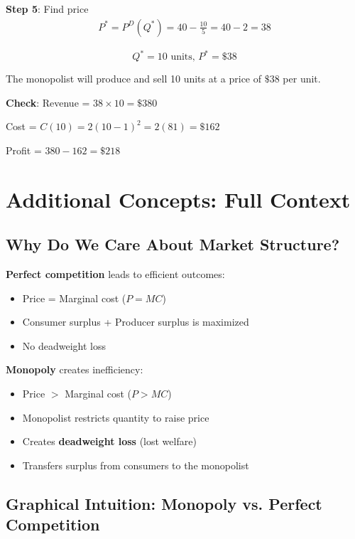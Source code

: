 \documentclass[12pt]{article}
\begin{document}
\textbf{Step 5}: Find price
\begin{align*}
P^* = P^D(Q^*) = 40 - \frac{10}{5} = 40 - 2 = 38
\end{align*}

\begin{keyidea}[Answer to 1B]
$$\boxed{Q^* = 10 \text{ units, } P^* = \$38}$$

The monopolist will produce and sell 10 units at a price of $\$38$ per unit.

\vspace{0.3cm}
\textbf{Check}: Revenue = $38 \times 10 = \$380$

Cost = $C(10) = 2(10-1)^2 = 2(81) = \$162$

Profit = $380 - 162 = \$218$
\end{keyidea}

\newpage

\section{Additional Concepts: Full Context}

\subsection{Why Do We Care About Market Structure?}

\begin{keyidea}
\textbf{Perfect competition} leads to efficient outcomes:
\begin{itemize}
\item Price = Marginal cost ($P = MC$)
\item Consumer surplus + Producer surplus is maximized
\item No deadweight loss
\end{itemize}

\textbf{Monopoly} creates inefficiency:
\begin{itemize}
\item Price $>$ Marginal cost ($P > MC$)
\item Monopolist restricts quantity to raise price
\item Creates \textbf{deadweight loss} (lost welfare)
\item Transfers surplus from consumers to the monopolist
\end{itemize}
\end{keyidea}

\subsection{Graphical Intuition: Monopoly vs. Perfect Competition}
\end{document}
